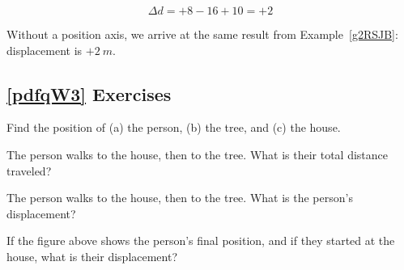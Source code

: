\documentclass[main.tex]{subfiles}
\begin{document}
\begin{equation*}
    \Delta d = + 8 - 16 + 10 = +2
\end{equation*}

Without a position axis, we arrive at the same result from Example~\ref{g2RSJB}: displacement is $+\SI{2}{m}$.

\solutionEnd

\vspace{1em}

\cyanhrule

\subsection*{\ref{pdfqW3} Exercises}

\begin{center}
\end{center}

\begin{exercise} \label{kE0eEH}
    Find the position of (a) the person, (b) the tree, and (c) the house.
\end{exercise}

\begin{exercise} \label{dOncsX}
    The person walks to the house, then to the tree. What is their total distance traveled?
\end{exercise}

\begin{exercise} \label{Ka0olk}
    The person walks to the house, then to the tree. What is the person's displacement?
\end{exercise}

\begin{exercise}
    If the figure above shows the person's final position, and if they started at the house, what is their displacement?
\end{exercise}
\end{document}
